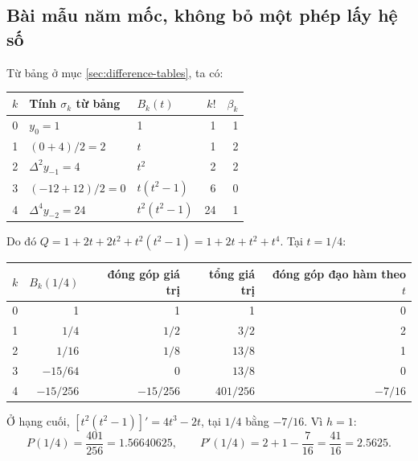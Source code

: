\subsection{Bài mẫu năm mốc, không bỏ một phép lấy hệ số}
Từ bảng ở mục \ref{sec:difference-tables}, ta có:
\begin{center}\small
\begin{tabular}{@{}rllrr@{}}\toprule
$k$ & Tính $\sigma_k$ từ bảng & $B_k(t)$ & $k!$ & $\beta_k$\\\midrule
0 & $y_0=1$ & 1 & 1 & 1\\
1 & $(0+4)/2=2$ & $t$ & 1 & 2\\
2 & $\Delta^2y_{-1}=4$ & $t^2$ & 2 & 2\\
3 & $(-12+12)/2=0$ & $t(t^2-1)$ & 6 & 0\\
4 & $\Delta^4y_{-2}=24$ & $t^2(t^2-1)$ & 24 & 1\\\bottomrule
\end{tabular}\end{center}
Do đó $Q=1+2t+2t^2+t^2(t^2-1)=1+2t+t^2+t^4$. Tại $t=1/4$:
\begin{center}\small
\begin{tabular}{@{}rrrrr@{}}\toprule
$k$ & $B_k(1/4)$ & đóng góp giá trị & tổng giá trị & đóng góp đạo hàm theo $t$\\\midrule
0 & 1 & 1 & 1 & 0\\
1 & $1/4$ & $1/2$ & $3/2$ & 2\\
2 & $1/16$ & $1/8$ & $13/8$ & 1\\
3 & $-15/64$ & 0 & $13/8$ & 0\\
4 & $-15/256$ & $-15/256$ & $401/256$ & $-7/16$\\\bottomrule
\end{tabular}\end{center}
Ở hạng cuối, $[t^2(t^2-1)]'=4t^3-2t$, tại $1/4$ bằng $-7/16$. Vì $h=1$:
\[
 P(1/4)=\frac{401}{256}=1.56640625,\qquad
 P'(1/4)=2+1-\frac7{16}=\frac{41}{16}=2.5625.
\]


